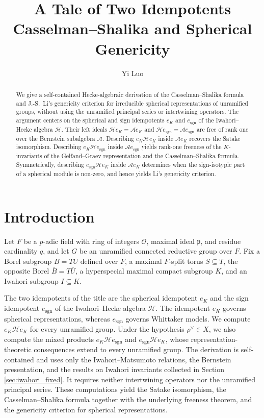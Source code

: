 \documentclass[12pt]{article}
\title{%
  {\bfseries A Tale of Two Idempotents}\\[0.35em]
  {\large\normalfont Casselman--Shalika and Spherical Genericity}%
}
\author{Yi Luo}
\date{}
\numberwithin{equation}{section}
\theoremstyle{definition}
\theoremstyle{remark}
\theoremstyle{plain}
\begin{document}
\maketitle

\begin{abstract}
We give a self-contained Hecke-algebraic derivation of the Casselman--Shalika formula and J.-S.\ Li's genericity criterion for irreducible spherical representations of unramified groups, without using the unramified principal series or intertwining operators. The argument centers on the spherical and sign idempotents $e_K$ and $e_{\mathrm{sgn}}$ of the Iwahori--Hecke algebra $\mathcal H$. Their left ideals $\mathcal He_K=\mathcal Ae_K$ and $\mathcal He_{\mathrm{sgn}}=\mathcal Ae_{\mathrm{sgn}}$ are free of rank one over the Bernstein subalgebra $\mathcal A$. Describing $e_K\mathcal He_K$ inside $\mathcal Ae_K$ recovers the Satake isomorphism. Describing $e_K\mathcal He_{\mathrm{sgn}}$ inside $\mathcal Ae_{\mathrm{sgn}}$ yields rank-one freeness of the $K$-invariants of the Gelfand--Graev representation and the Casselman--Shalika formula. Symmetrically, describing $e_{\mathrm{sgn}}\mathcal He_K$ inside $\mathcal Ae_K$ determines when the sign-isotypic part of a spherical module is non-zero, and hence yields Li's genericity criterion.
\end{abstract}


\section{Introduction}

Let $F$ be a $p$-adic field with ring of integers $\mathcal{O}$, maximal ideal $\mathfrak{p}$, and residue cardinality $q$, and let $G$ be an unramified connected reductive group over $F$. Fix a Borel subgroup $B = TU$ defined over $F$, a maximal $F$-split torus $S \subseteq T$, the opposite Borel $\overline{B} = T\overline{U}$, a hyperspecial maximal compact subgroup $K$, and an Iwahori subgroup $I \subseteq K$.

The two idempotents of the title are the spherical idempotent $e_{K}$ and the sign idempotent $e_{\mathrm{sgn}}$ of the Iwahori--Hecke algebra $\mathcal{H}$. The idempotent $e_{K}$ governs spherical representations, whereas $e_{\mathrm{sgn}}$ governs Whittaker models. We compute $e_{K}\mathcal{H}e_{K}$ for every unramified group. Under the hypothesis $\rho^\vee\in X$, we also compute the mixed products $e_{K}\mathcal{H}e_{\mathrm{sgn}}$ and $e_{\mathrm{sgn}}\mathcal{H}e_{K}$, whose representation-theoretic consequences extend to every unramified group. The derivation is self-contained and uses only the Iwahori--Matsumoto relations, the Bernstein presentation, and the results on Iwahori invariants collected in Section \ref{sec:iwahori_fixed}. It requires neither intertwining operators nor the unramified principal series. These computations yield the Satake isomorphism, the Casselman--Shalika formula together with the underlying freeness theorem, and the genericity criterion for spherical representations.
\end{document}
